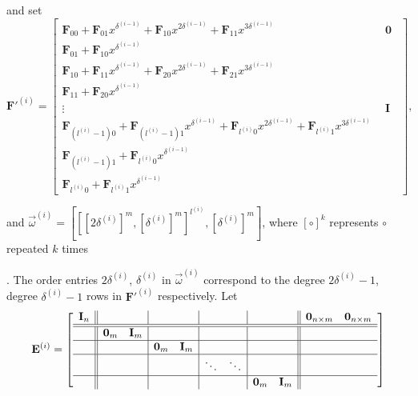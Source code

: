and set \begin{equation}
\mathbf{F}'^{\left(i\right)}=\left[\begin{array}{l|c}
\mathbf{F}_{00}+\mathbf{F}_{01}x^{\delta^{\left(i-1\right)}}+\mathbf{F}_{10}x^{2\delta^{\left(i-1\right)}}+\mathbf{F}_{11}x^{3\delta^{\left(i-1\right)}} & ~~\mathbf{0}~~\\
\hline \mathbf{F}_{01}+\mathbf{F}_{10}x^{\delta^{\left(i-1\right)}}\\
\mathbf{F}_{10}+\mathbf{F}_{11}x^{\delta^{\left(i-1\right)}}+\mathbf{F}_{20}x^{2\delta^{\left(i-1\right)}}+\mathbf{F}_{21}x^{3\delta^{\left(i-1\right)}}\\
\mathbf{F}_{11}+\mathbf{F}_{20}x^{\delta^{\left(i-1\right)}}\\
\vdots & ~~\mathbf{I}~~\\
\mathbf{F}_{\left(l^{\left(i\right)}-1\right)0}+\mathbf{F}_{\left(l^{\left(i\right)}-1\right)1}x^{\delta^{\left(i-1\right)}}+\mathbf{F}_{l^{\left(i\right)}0}x^{2\delta^{\left(i-1\right)}}+\mathbf{F}_{l^{\left(i\right)}1}x^{3\delta^{\left(i-1\right)}}\\
\mathbf{F}_{\left(l^{\left(i\right)}-1\right)1}+\mathbf{F}_{l^{\left(i\right)}0}x^{\delta^{\left(i-1\right)}}\\
\mathbf{F}_{l^{\left(i\right)}0}+\mathbf{F}_{l^{\left(i\right)}1}x^{\delta^{\left(i-1\right)}}\end{array}\right],\label{eq:extendedStorjohannTransform}\end{equation}
\begin{comment}
This is not ideal, but no better idea. 
\end{comment}
{} and $\vec{\omega}^{\left(i\right)}=\left[\left[[2\delta^{\left(i\right)}]^{m},[\delta^{\left(i\right)}]^{m}\right]^{l^{\left(i\right)}},[\delta^{\left(i\right)}]^{m}\right]$,
where $\left[\circ\right]^{k}$ represents $\circ$ repeated $k$
times%
\begin{comment}
Not sure if using this notation is a good thing to do, but it saves
space and makes presentation easier 
\end{comment}
{}. The order entries $2\delta^{\left(i\right)}$, $\delta^{\left(i\right)}$
in $\vec{\omega}^{\left(i\right)}$ correspond to the degree $2\delta^{\left(i\right)}-1$,
degree $\delta^{\left(i\right)}-1$ rows in $\mathbf{F}'^{\left(i\right)}$
respectively. Let \[
\mathbf{E}^{\left(i\right)}=\left[\begin{array}{c||cc|cc|cc|cc||cc}
\mathbf{I}_{n} &  &  &  &  &  &  &  &  & \mathbf{0}_{n\times m} & \mathbf{0}_{n\times m}\\
\hline\hline  & \mathbf{0}_{m} & \mathbf{I}_{m} &  &  &  &  &  &  & \ \\
\hline  &  &  & \mathbf{0}_{m} & \mathbf{I}_{m} &  &  &  &  & \ \\
\hline  &  &  &  &  & \ddots & \ddots &  &  & \ \\
\hline  &  &  &  &  &  &  & \mathbf{0}_{m} & \mathbf{I}_{m}\end{array}\right]\]
